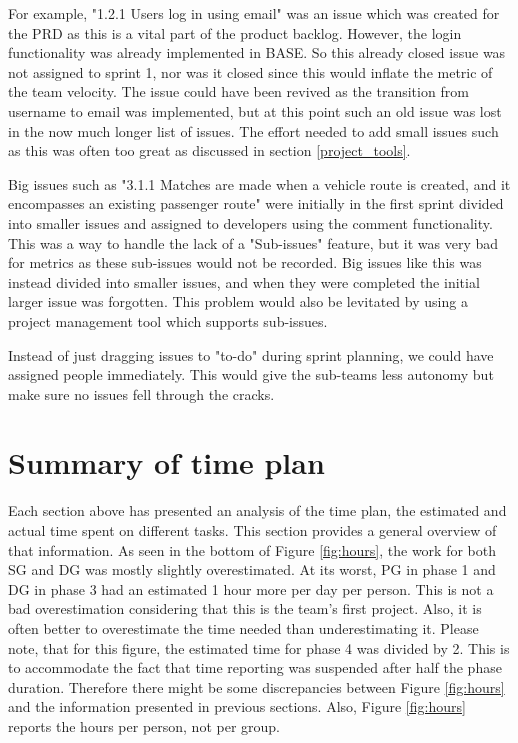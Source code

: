 \documentclass{article}
\begin{document}
For example, "1.2.1 Users log in using email" was an issue which was created for the PRD as this is a vital part of the product backlog. However, the login functionality was already implemented in BASE. So this already closed issue was not assigned to sprint 1, nor was it closed since this would inflate the metric of the team velocity. The issue could have been revived as the transition from username to email was implemented, but at this point such an old issue was lost in the now much longer list of issues. The effort needed to add small issues such as this was often too great as discussed in section \ref{project_tools}.

Big issues such as "3.1.1 Matches are made when a vehicle route is created, and it encompasses an existing passenger route" were initially in the first sprint divided into smaller issues and assigned to developers using the comment functionality. This was a way to handle the lack of a "Sub-issues" feature, but it was very bad for metrics as these sub-issues would not be recorded. Big issues like this was instead divided into smaller issues, and when they were completed the initial larger issue was forgotten. This problem would also be levitated by using a project management tool which supports sub-issues.

Instead of just dragging issues to "to-do" during sprint planning, we could have assigned people immediately. This would give the sub-teams less autonomy but make sure no issues fell through the cracks. 


\section{Summary of time plan}
Each section above has presented an analysis of the time plan, the estimated and actual time spent on different tasks. This section provides a general overview of that information. As seen in the bottom of Figure \ref{fig:hours}, the work for both SG and DG was mostly slightly overestimated. At its worst, PG in phase 1 and DG in phase 3 had an estimated 1 hour more per day per person. This is not a bad overestimation considering that this is the team's first project. Also, it is often better to overestimate the time needed than underestimating it. Please note, that for this figure, the estimated time for phase 4 was divided by 2. This is to accommodate the fact that time reporting was suspended after half the phase duration. Therefore there might be some discrepancies between Figure \ref{fig:hours} and the information presented in previous sections. Also, Figure \ref{fig:hours} reports the hours per person, not per group.
\end{document}
